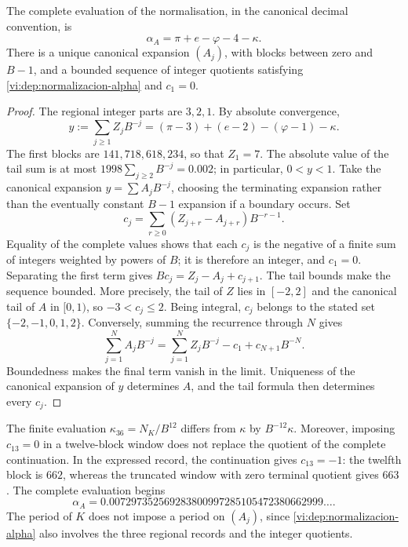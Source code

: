 \begin{theorem}
\label{vi:dep:alpha-completa}
The complete evaluation of the normalisation, in the canonical decimal
convention, is
\begin{equation}
 \alpha_A=\pi+e-\varphi-4-\kappa.
 \label{vi:dep:alpha-A}
\end{equation}
There is a unique canonical expansion \((A_j)\), with blocks between zero
and \(B-1\), and a bounded sequence of integer quotients satisfying
\eqref{vi:dep:normalizacion-alpha} and \(c_1=0\).
\end{theorem}
\begin{proof}
The regional integer parts are \(3,2,1\). By absolute convergence,
\[
 y:=\sum_{j\ge1}Z_jB^{-j}
   =(\pi-3)+(e-2)-(\varphi-1)-\kappa.
\]
The first blocks are \(141,718,618,234\), so that
\(Z_1=7\). The absolute value of the tail sum is at most
\(1998\sum_{j\ge2}B^{-j}=0.002\); in particular, \(0<y<1\).
Take the canonical expansion \(y=\sum A_jB^{-j}\), choosing the
terminating expansion rather than the eventually constant \(B-1\) expansion if a
boundary occurs. Set
\[
 c_j=\sum_{r\ge0}(Z_{j+r}-A_{j+r})B^{-r-1}.
\]
Equality of the complete values shows that each \(c_j\) is the
negative of a finite sum of integers weighted by powers of
\(B\); it is therefore an integer, and \(c_1=0\). Separating the first term
gives \(Bc_j=Z_j-A_j+c_{j+1}\). The tail bounds make the
sequence bounded. More precisely, the tail of \(Z\) lies in \([-2,2]\)
and the canonical tail of \(A\) in \([0,1)\), so
\(-3<c_j\le2\). Being integral, \(c_j\) belongs to the stated set
\(\{-2,-1,0,1,2\}\).
Conversely, summing the recurrence through \(N\) gives
\[
 \sum_{j=1}^N A_jB^{-j}
 =\sum_{j=1}^N Z_jB^{-j}-c_1+c_{N+1}B^{-N}.
\]
Boundedness makes the final term vanish in the limit. Uniqueness of the
canonical expansion of \(y\) determines \(A\), and the tail formula
then determines every \(c_j\).
\end{proof}

The finite evaluation \(\kappa_{36}=N_K/B^{12}\) differs from
\(\kappa\) by \(B^{-12}\kappa\). Moreover, imposing
\(c_{13}=0\) in a twelve-block window does not replace the quotient
of the complete continuation. In the expressed record, the continuation
gives \(c_{13}=-1\): the twelfth block is \(662\), whereas the
truncated window with zero terminal quotient gives \(663\). The complete
evaluation begins
\[
 \alpha_A=0.007297352569283800997285105472380662999\ldots.
\]
The period of \(K\) does not impose a period on \((A_j)\), since
\eqref{vi:dep:normalizacion-alpha} also involves the three
regional records and the integer quotients.

